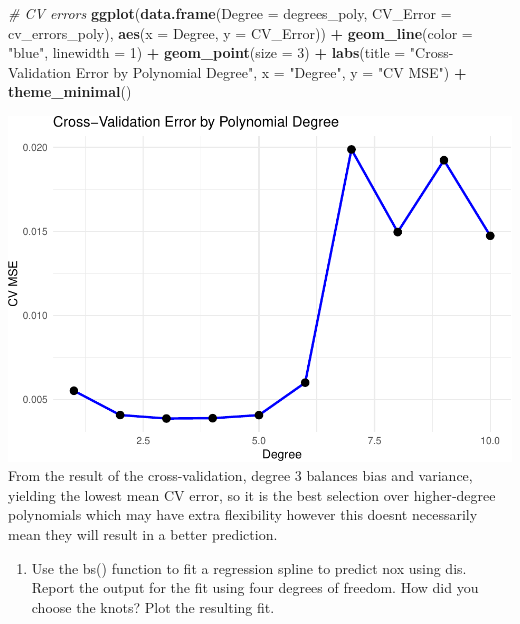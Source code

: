 \documentclass[
]{article}
\newenvironment{Shaded}{\begin{snugshade}}{\end{snugshade}}
\newcommand{\AttributeTok}[1]{\textcolor[rgb]{0.13,0.29,0.53}{#1}}
\newcommand{\CommentTok}[1]{\textcolor[rgb]{0.56,0.35,0.01}{\textit{#1}}}
\newcommand{\DecValTok}[1]{\textcolor[rgb]{0.00,0.00,0.81}{#1}}
\newcommand{\FunctionTok}[1]{\textcolor[rgb]{0.13,0.29,0.53}{\textbf{#1}}}
\newcommand{\NormalTok}[1]{#1}
\newcommand{\SpecialCharTok}[1]{\textcolor[rgb]{0.81,0.36,0.00}{\textbf{#1}}}
\newcommand{\StringTok}[1]{\textcolor[rgb]{0.31,0.60,0.02}{#1}}
\providecommand{\tightlist}{%
  \setlength{\itemsep}{0pt}\setlength{\parskip}{0pt}}
\begin{document}
\begin{Shaded}
\begin{Highlighting}[]
\CommentTok{\# CV errors}
\FunctionTok{ggplot}\NormalTok{(}\FunctionTok{data.frame}\NormalTok{(}\AttributeTok{Degree =}\NormalTok{ degrees\_poly, }\AttributeTok{CV\_Error =}\NormalTok{ cv\_errors\_poly), }
       \FunctionTok{aes}\NormalTok{(}\AttributeTok{x =}\NormalTok{ Degree, }\AttributeTok{y =}\NormalTok{ CV\_Error)) }\SpecialCharTok{+}
  \FunctionTok{geom\_line}\NormalTok{(}\AttributeTok{color =} \StringTok{"blue"}\NormalTok{, }\AttributeTok{linewidth =} \DecValTok{1}\NormalTok{) }\SpecialCharTok{+}
  \FunctionTok{geom\_point}\NormalTok{(}\AttributeTok{size =} \DecValTok{3}\NormalTok{) }\SpecialCharTok{+}
  \FunctionTok{labs}\NormalTok{(}\AttributeTok{title =} \StringTok{"Cross{-}Validation Error by Polynomial Degree"}\NormalTok{,}
       \AttributeTok{x =} \StringTok{"Degree"}\NormalTok{,}
       \AttributeTok{y =} \StringTok{"CV MSE"}\NormalTok{) }\SpecialCharTok{+}
  \FunctionTok{theme\_minimal}\NormalTok{()}
\end{Highlighting}
\end{Shaded}

\includegraphics{chapter-07-hw_files/figure-latex/unnamed-chunk-6-1.pdf}
From the result of the cross-validation, degree 3 balances bias and
variance, yielding the lowest mean CV error, so it is the best selection
over higher‑degree polynomials which may have extra flexibility however
this doesnt necessarily mean they will result in a better prediction.

\begin{enumerate}
\def\labelenumi{(\alph{enumi})}
\setcounter{enumi}{3}
\tightlist
\item
  Use the bs() function to fit a regression spline to predict nox using
  dis. Report the output for the fit using four degrees of freedom. How
  did you choose the knots? Plot the resulting fit.
\end{enumerate}
\end{document}
